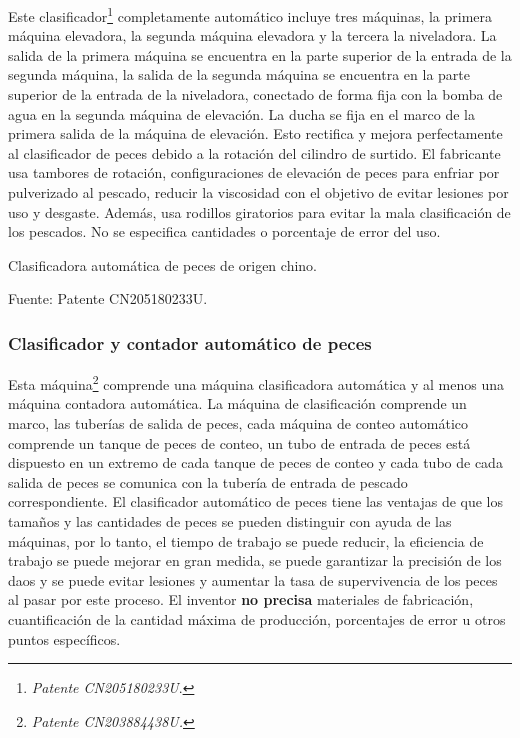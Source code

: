 Este clasificador\footnote{\textit{Patente CN205180233U}.} completamente automático incluye tres máquinas, la primera máquina elevadora, la segunda máquina elevadora y la tercera la niveladora. La salida de la primera máquina se encuentra en la parte superior de la entrada de la segunda máquina, la salida de la segunda máquina se encuentra en la parte superior de la entrada de la niveladora, conectado de forma fija con la bomba de agua en la segunda máquina de elevación. La ducha se fija en el marco de la primera salida de la máquina de elevación. Esto rectifica y mejora perfectamente al clasificador de peces debido a la rotación del cilindro de surtido.\citep{Fang2015} El fabricante usa tambores de rotación, configuraciones de elevación de peces para enfriar por pulverizado al pescado, reducir la viscosidad con el objetivo de evitar lesiones por uso y desgaste. Además, usa rodillos giratorios para evitar la mala clasificación de los pescados. No se especifica cantidades o porcentaje de error del uso.

\begin{myfigure}[H]
	\footnotesize\centering
	\caption{Clasificadora automática de peces de origen chino.}
	\begin{myflushcenter}
		Fuente: Patente CN205180233U.
	\end{myflushcenter}
	\label{fig:clasificadora automatica de peces de origen chino}
\end{myfigure}

\subsubsection{Clasificador y contador automático de peces}

Esta máquina\footnote{\textit{Patente CN203884438U.}} comprende una máquina clasificadora automática y al menos una máquina contadora automática. La máquina de clasificación comprende un marco, las tuberías de salida de peces, cada máquina de conteo automático comprende un tanque de peces de conteo, un tubo de entrada de peces está dispuesto en un extremo de cada tanque de peces de conteo y cada tubo de cada salida de peces se comunica con la tubería de entrada de pescado correspondiente. El clasificador automático de peces tiene las ventajas de que los tamaños y las cantidades de peces se pueden distinguir con ayuda de las máquinas, por lo tanto, el tiempo de trabajo se puede reducir, la eficiencia de trabajo se puede mejorar en gran medida, se puede garantizar la precisión de los daos y se puede evitar lesiones y aumentar la tasa de supervivencia de los peces al pasar por este proceso.\citep{Jingwen2014} El inventor \textbf{no precisa} materiales de fabricación, cuantificación de la cantidad máxima de producción, porcentajes de error u otros puntos específicos.

